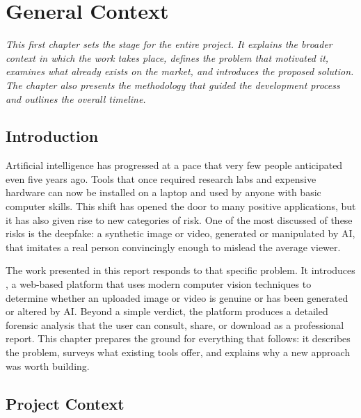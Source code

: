 
\chapter{General Context}
\label{chap:context}

\textit{This first chapter sets the stage for the entire project. It explains the broader context in which the work takes place, defines the problem that motivated it, examines what already exists on the market, and introduces the proposed solution. The chapter also presents the methodology that guided the development process and outlines the overall timeline.}

\vspace{1cm}

\section{Introduction}

Artificial intelligence has progressed at a pace that very few people anticipated even five years ago. Tools that once required research labs and expensive hardware can now be installed on a laptop and used by anyone with basic computer skills. This shift has opened the door to many positive applications, but it has also given rise to new categories of risk. One of the most discussed of these risks is the deepfake: a synthetic image or video, generated or manipulated by AI, that imitates a real person convincingly enough to mislead the average viewer.

The work presented in this report responds to that specific problem. It introduces \deepguard{}, a web-based platform that uses modern computer vision techniques to determine whether an uploaded image or video is genuine or has been generated or altered by AI. Beyond a simple verdict, the platform produces a detailed forensic analysis that the user can consult, share, or download as a professional report. This chapter prepares the ground for everything that follows: it describes the problem, surveys what existing tools offer, and explains why a new approach was worth building.

\section{Project Context}

